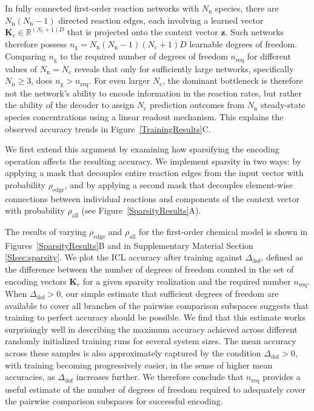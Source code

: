 \documentclass[%
reprint,
superscriptaddress,
amsmath,amssymb,
aps,
]{revtex4-2}
\begin{document}
	In fully connected first-order reaction networks with $N_\text{n}$ species, there are $N_\text{n}(N_\text{n}-1)$ directed reaction edges, each involving a learned vector $\mathbf{K}_r \in \mathbb{R}^{(N_\text{c}+1)D}$ that is projected onto the context vector $\mathbf{z}$. Such networks therefore possess 
	$n_\text{g} = N_\text{n}(N_\text{n}-1)(N_\text{c}+1)D$ learnable degrees of freedom. Comparing $n_\text{g}$ to the required number of degrees of freedom $n_\text{req}$ for different values of $N_\text{n}=N_\text{c}$ reveals that only for sufficiently large networks, specifically $N_\text{n} \geq 3$, does $n_\text{g} > n_\text{req}$. For even larger $N_\text{c}$, the dominant bottleneck is therefore not the network’s ability to encode information in the reaction rates, but rather the ability of the decoder to assign $N_\text{c}$ prediction outcomes from $N_\text{n}$ steady-state species concentrations using a linear readout mechanism. This explains the observed accuracy trends in Figure~\ref{TrainingResults}C.
	
	We first extend this argument by examining how sparsifying the encoding operation affects the resulting accuracy. We implement sparsity in two ways: by applying a mask that decouples entire reaction edges from the input vector with probability $\rho_\text{edge}$, and by applying a second mask that decouples element-wise connections between individual reactions and components of the context vector with probability $\rho_\text{all}$ (see Figure~\ref{SparsityResults}A).  
	
	The results of varying $\rho_\text{edge}$ and $\rho_\text{all}$ for the first-order chemical model is shown in Figures~\ref{SparsityResults}B and in Supplementary Material Section \ref{SIsec:sparsity}. We plot the ICL accuracy after training against $\Delta_\text{dof}$, defined as the difference between the number of degrees of freedom counted in the set of encoding vectors $\mathbf{K}_r$ for a given sparsity realization and the required number $n_\text{req}$. When $\Delta_\text{dof} > 0$, our simple estimate that sufficient degrees of freedom are available to cover all branches of the pairwise comparison subspaces suggests that training to perfect accuracy should be possible. We find that this estimate works surprisingly well in describing the maximum accuracy achieved across different randomly initialized training runs for several system sizes. The mean accuracy across these samples is also approximately captured by the condition $\Delta_\text{dof} > 0$, with training becoming progressively easier, in the sense of higher mean accuracies, as $\Delta_\text{dof}$ increases further. We therefore conclude that $n_\text{req}$ provides a useful estimate of the number of degrees of freedom required to adequately cover the pairwise comparison subspaces for successful encoding.
	
\end{document}
